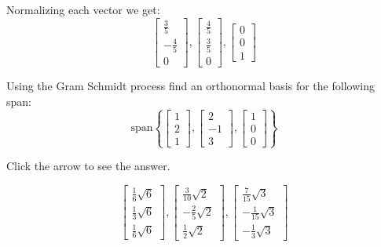 \documentclass{ximera}
\begin{document}
\begin{problem}
\begin{expandable}{}{}
Normalizing each vector we get:
\[
\left[
\begin{array}{c}
\frac{3}{5} \\
-\frac{4}{5} \\
0
\end{array}
\right] ,\left[
\begin{array}{c}
\frac{4}{5} \\
\frac{3}{5} \\
0
\end{array}
\right] ,\left[
\begin{array}{c}
0 \\
0 \\
1
\end{array}
\right]
\]
\end{expandable}
\end{problem}

\begin{problem}\label{prob:use_GS_on_span}
Using the Gram Schmidt process find an
orthonormal basis for the following span:
 \[
\mbox{span} \left\{ \left[
\begin{array}{r}
1 \\
2 \\
1
\end{array}
\right] ,\left[
\begin{array}{r}
2 \\
-1 \\
3
\end{array}
\right] , \left[
\begin{array}{r}
1 \\
0 \\
0
\end{array}
\right] \right\}
\]

Click the arrow to see the answer.
\begin{expandable}{}{}
\[
\left[
\begin{array}{c}
\frac{1}{6}\sqrt{6} \\
\frac{1}{3}\sqrt{6} \\
\frac{1}{6}\sqrt{6}
\end{array}
\right] ,\left[
\begin{array}{c}
\frac{3}{10}\sqrt{2} \\
-\frac{2}{5}\sqrt{2} \\
\frac{1}{2}\sqrt{2}
\end{array}
\right] ,\left[
\begin{array}{c}
\frac{7}{15}\sqrt{3} \\
-\frac{1}{15}\sqrt{3} \\
-\frac{1}{3}\sqrt{3}
\end{array}
\right]
\]
\end{expandable}
\end{problem}
\end{document}

